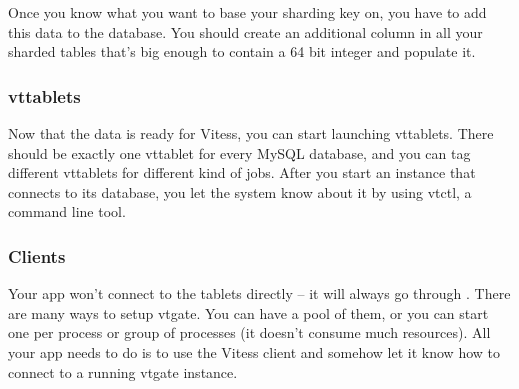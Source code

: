 Once you know what you want to base your sharding key on, you have to add this
data to the database. You should create an additional column in all your sharded
tables that’s big enough to contain a 64 bit integer and populate it.

\subsubsection{vttablets}\hypertarget{vttablets}{}\label{vttablets}

Now that the data is ready for Vitess, you can start launching vttablets. There
should be exactly one vttablet for every MySQL database, and you can tag
different vttablets for different kind of jobs. After you start an instance that
connects to its database, you let the system know about it by using vtctl, a
command line tool.

\subsubsection{Clients}\hypertarget{clients}{}\label{clients}

Your app won’t connect to the tablets directly – it will always go through
. There are many ways to setup vtgate. You can have a pool of them, or you
can start one per process or group of processes (it doesn’t consume much
resources). All your app needs to do is to use the Vitess client and somehow let
it know how to connect to a running vtgate instance.

